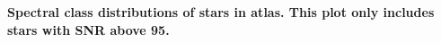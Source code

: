 {\bf  Spectral class distributions of stars in atlas. This plot only includes stars with SNR above 95.\label{fig:hiso-spt-type}}